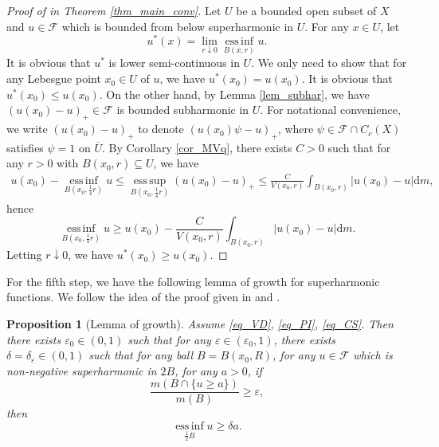 \documentclass[11pt,a4paper]{article}
\numberwithin{equation}{section}
\newcommand{\esup}{\operatorname*{ess\,sup}}
\newcommand{\einf}{\operatorname*{ess\,inf}}
\theoremstyle{plain}
\newtheorem{proposition}[theorem]{Proposition}
\theoremstyle{definition}
\begin{document}
\begin{proof}[Proof of \hyperlink{eq_LSC}{} in Theorem \ref{thm_main_conv}]
Let $U$ be a bounded open subset of $X$ and $u\in \mathcal{F}$ which is bounded from below superharmonic in $U$. For any $x\in U$, let
$$u^*(x)=\lim_{r\downarrow0}\einf_{B(x,r)}u.$$
It is obvious that $u^*$ is lower semi-continuous in $U$. We only need to show that for any Lebesgue point $x_0\in U$ of $u$, we have $u^*(x_0)=u(x_0)$. It is obvious that $u^*(x_0)\le u(x_0)$. On the other hand, by Lemma \ref{lem_subhar}, we have $(u(x_0)-u)_+\in \mathcal{F}$ is bounded subharmonic in $U$. For notational convenience, we write $(u(x_0)-u)_+$ to denote $(u(x_0)\psi-u)_+$, where $\psi\in \mathcal{F}\cap C_c(X)$ satisfies $\psi=1$ on $\overline{U}$. By Corollary \ref{cor_MVq}, there exists $C>0$ such that for any $r>0$ with $B(x_0,r)\subseteq U$, we have
\begin{align*}
u(x_0)-\einf_{B(x_0,\frac{1}{4}r)}u\le\esup_{B(x_0,\frac{1}{4}r)}\left(u(x_0)-u\right)_+\le \frac{C}{V(x_0,r)}\int_{B(x_0,r)}\lvert u(x_0)-u\rvert\mathrm{d}m,
\end{align*}
hence
$$\einf_{B(x_0,\frac{1}{4}r)}u\ge u(x_0)-\frac{C}{V(x_0,r)}\int_{B(x_0,r)}\lvert u(x_0)-u\rvert\mathrm{d}m.$$
Letting $r\downarrow0$, we have $u^*(x_0)\ge u(x_0)$.
\end{proof}

For the fifth step, we have the following lemma of growth for superharmonic functions. We follow the idea of the proof given in \cite[LEMMA 3.5]{HY23} and \cite[Lemma 4.1]{GHH18}.

\begin{proposition}[Lemma of growth]\label{prop_LG}
Assume \ref{eq_VD}, \ref{eq_PI}, \ref{eq_CS}. Then there exists $\varepsilon_0\in(0,1)$ such that for any $\varepsilon\in(\varepsilon_0,1)$, there exists $\delta=\delta_\varepsilon\in(0,1)$ such that for any ball $B=B(x_0,R)$, for any $u\in\mathcal{F}$ which is non-negative superharmonic in $2B$, for any $a>0$, if
$$\frac{m(B\cap\{u\ge a\})}{m(B)}\ge\varepsilon,$$
then
$$\einf_{\frac{1}{2}B}u\ge\delta a.$$
\end{proposition}
\end{document}
